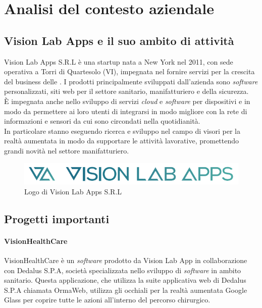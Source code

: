 
\chapter{Analisi del contesto aziendale}
\section{Vision Lab Apps e il suo ambito di attività}
  Vision Lab Apps S.R.L è una startup nata a New York nel 2011, con sede operativa a Torri di Quartesolo (VI), impegnata nel fornire servizi per la crescita del business delle .
  I prodotti principalmente sviluppati dall'azienda sono \textit{software} personalizzati, siti web per il settore sanitario, manifatturiero e della sicurezza.\\
  È impegnata anche nello sviluppo di servizi \textit{cloud} e \textit{software} per dispositivi  e  in modo da permettere ai loro utenti di integrarsi in modo migliore con la rete di informazioni e sensori da cui sono circondati nella quotidianità.\\
  In particolare stanno eseguendo ricerca e sviluppo nel campo di visori per la realtà aumentata in modo da supportare le attività lavorative, promettendo grandi novità nel settore manifatturiero.
  \begin{figure}[h]
    \centering
    \includegraphics[scale=0.3]{immagini/Logo-VLA-trasparente.png}
    \caption{Logo di Vision Lab Apps S.R.L}
    \label{logoVLA}
  \end{figure}
  \section{Progetti importanti}
    \subsubsection*{VisionHealthCare}
      VisionHealthCare è un \textit{software} prodotto da Vision Lab App in collaborazione con Dedalus S.P.A, società specializzata nello sviluppo di \textit{software} in ambito sanitario.
      Questa applicazione, che utilizza la suite applicativa web di Dedalus S.P.A chiamata OrmaWeb, utilizza gli occhiali per la realtà aumentata Google Glass per coprire tutte le azioni all'interno del percorso chirurgico.

